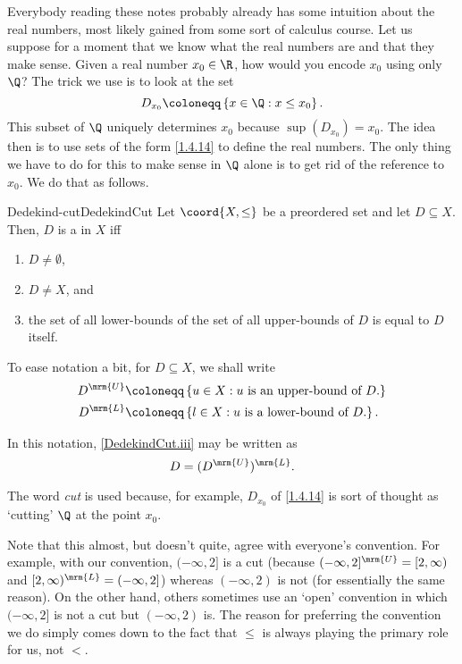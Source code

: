 Everybody reading these notes probably already has some intuition about the real numbers, most likely gained from some sort of calculus course.  Let us suppose for a moment that we know what the real numbers are and that they make sense.  Given a real number $x_0\in \R$, how would you encode $x_0$ using only $\Q$?  The trick we use is to look at the set
\begin{equation}\label{1.4.14}
D_{x_0}\coloneqq \left\{ x\in \Q :x\leq x_0\right\} .
\end{equation}
This subset of $\Q$ uniquely determines $x_0$ because $\sup (D_{x_0})=x_0$.  The idea then is to use sets of the form \eqref{1.4.14} to define the real numbers.  The only thing we have to do for this to make sense in $\Q$ alone is to get rid of the reference to $x_0$.  We do that as follows.
\begin{dfn}{Dedekind-cut}{DedekindCut}
Let $\coord{X,\leq}$ be a preordered set and let $D\subseteq X$.  Then, $D$ is a  in $X$ iff
\begin{enumerate}
\item \label{DedekindCut.i}$D\neq \emptyset$, 
\item \label{DedekindCut.ii}$D\neq X$, and
\item \label{DedekindCut.iii}the set of all lower-bounds of the set of all upper-bounds of $D$ is equal to $D$ itself.
\end{enumerate}
\begin{rmk}
To ease notation a bit, for $D\subseteq X$, we shall write
\begin{equation}
\begin{aligned}
D^{\mrm{U}} & \coloneqq \left\{ u\in X:u\text{ is an upper-bound of }D\text{.}\right\} \\
D^{\mrm{L}} & \coloneqq \left\{ l\in X:u\text{ is a lower-bound of }D\text{.}\right\} .
\end{aligned}
\end{equation}
\end{rmk}
In this notation, \eqref{DedekindCut.iii} may be written as
\begin{equation}
D=(D^{\mrm{U}})^{\mrm{L}}.
\end{equation}
\begin{rmk}
The word \emph{cut} is used because, for example, $D_{x_0}$ of \eqref{1.4.14} is sort of thought as `cutting' $\Q$ at the point $x_0$.
\end{rmk}
\begin{rmk}
Note that this almost, but doesn't quite, agree with everyone's convention.  For example, with our convention, $(-\infty ,2]$ is a cut (because $(-\infty ,2]^{\mrm{U}}=[2,\infty )$ and $[2,\infty )^{\mrm{L}}=(-\infty ,2]$) whereas $(-\infty ,2)$ is not (for essentially the same reason).  On the other hand, others sometimes use an `open' convention in which $(-\infty ,2]$ is not a cut but $(-\infty ,2)$ is.  The reason for preferring the convention we do simply comes down to the fact that $\leq$ is always playing the primary role for us, not $<$.
\end{rmk}
\end{dfn}
